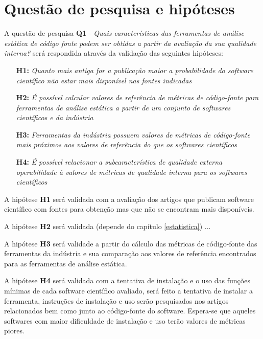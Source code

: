 \documentclass[qual, classic, a4paper]{ufbathesis}
\begin{document}

\section{Questão de pesquisa e hipóteses}

A questão de pesquisa {\bf Q1} - {\it Quais características das ferramentas de
análise estática de código fonte podem ser obtidas a partir da avaliação da
sua qualidade interna?} será respondida através da validação das seguintes
hipóteses:

\begin{enumerate}
  \item[{\bf H1:}] {\em Quanto mais antiga for a publicação maior a
    probabilidade do software científico não estar mais disponível nas fontes
    indicadas}
  \item[{\bf H2:}] {\em É possível calcular valores de referência de métricas
    de código-fonte para ferramentas de análise estática a partir de um
    conjunto de softwares científicos e da indústria}
  \item[{\bf H3:}] {\em Ferramentas da indústria possuem valores de métricas
    de código-fonte mais próximos aos valores de referência do que os
    softwares científicos}
  \item[{\bf H4:}] {\em É possível relacionar a subcaracterística de qualidade
    externa operabilidade à valores de métricas de qualidade interna para os
    softwares científicos}
\end{enumerate}


A hipótese {\bf H1} será validada com a avaliação dos artigos que publicam
software científico com fontes para obtenção mas que não se encontram mais
disponíveis.

A hipótese {\bf H2} será validada (depende do capítulo \ref{estatistica}) ...

A hipótese {\bf H3} será validade a partir do cálculo das métricas de
código-fonte das ferramentas da indústria e sua comparação aos valores de
referência encontrados para as ferramentas de análise estática.

A hipótese {\bf H4} será validada com a tentativa de instalação e o uso das
funções mínimas de cada software científico avaliado, será feito a tentativa
de instalar a ferramenta, instruções de instalação e uso serão pesquisados nos
artigos relacionados bem como junto ao código-fonte do software. Espera-se que
aqueles softwares com maior dificuldade de instalação e uso terão valores de
métricas piores.
\end{document}
